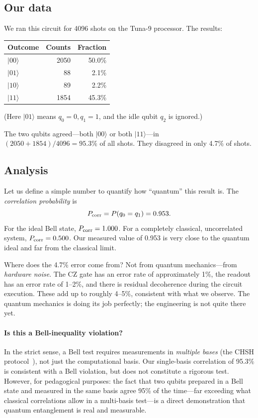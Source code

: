\documentclass[amsmath,amssymb,reprint,aps,prb]{revtex4-2}
\newcommand{\ket}[1]{|#1\rangle}
\begin{document}
\subsection{Our data}

We ran this circuit for 4096 shots on the Tuna-9 processor.  The
results:
\begin{center}
\begin{tabular}{lrr}
\toprule
Outcome & Counts & Fraction \\
\midrule
$\ket{00}$ & 2050 & 50.0\% \\
$\ket{01}$ &   88 &  2.1\% \\
$\ket{10}$ &   89 &  2.2\% \\
$\ket{11}$ & 1854 & 45.3\% \\
\bottomrule
\end{tabular}
\end{center}
(Here $\ket{01}$ means $q_0 = 0, q_1 = 1$, and the idle qubit
$q_2$ is ignored.)

The two qubits agreed---both $\ket{00}$ or both $\ket{11}$---in
$(2050 + 1854)/4096 = 95.3\%$ of all shots.  They disagreed in only
4.7\% of shots.

\subsection{Analysis}

Let us define a simple number to quantify how ``quantum'' this
result is.  The \emph{correlation probability} is
\begin{equation}
P_{\rm corr} = P(q_0 = q_1) = 0.953.
\end{equation}
For the ideal Bell state, $P_{\rm corr} = 1.000$.  For a
completely classical, uncorrelated system, $P_{\rm corr} = 0.500$.
Our measured value of 0.953 is very close to the quantum ideal and
far from the classical limit.

Where does the 4.7\% error come from?  Not from quantum mechanics---from
\emph{hardware noise}.  The CZ gate has an error rate of
approximately 1\%, the readout has an error rate of 1--2\%, and
there is residual decoherence during the circuit execution.  These
add up to roughly 4--5\%, consistent with what we observe.  The
quantum mechanics is doing its job perfectly; the engineering is not
quite there yet.

\paragraph{Is this a Bell-inequality violation?}
In the strict sense, a Bell test requires measurements in
\emph{multiple bases} (the CHSH protocol~\cite{CHSH1969}), not
just the computational basis.  Our single-basis correlation of
95.3\% is consistent with a Bell violation, but does not constitute
a rigorous test.  However, for pedagogical purposes: the fact that
two qubits prepared in a Bell state and measured in the same basis
agree 95\% of the time---far exceeding what classical correlations
allow in a multi-basis test---is a direct demonstration that quantum
entanglement is real and measurable.
\end{document}
